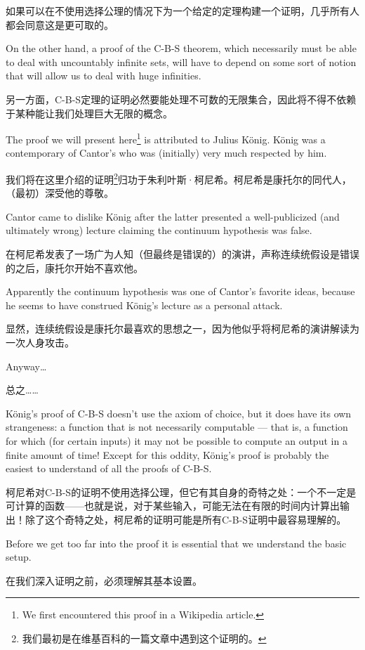 如果可以在不使用选择公理的情况下为一个给定的定理构建一个证明，几乎所有人都会同意这是更可取的。

On the other hand,
a proof of the C-B-S theorem, which necessarily must be able to deal with
uncountably infinite sets, will have to depend on some sort of notion that
will allow us to deal with huge infinities.

另一方面，C-B-S定理的证明必然要能处理不可数的无限集合，因此将不得不依赖于某种能让我们处理巨大无限的概念。

The proof we will present here\footnote{We first encountered this proof
    in a Wikipedia article\cite{wiki-CBS}.} is attributed to Julius K\"{o}nig.
K\"{o}nig was a contemporary of Cantor's who was (initially) very
much respected by him.

我们将在这里介绍的证明\footnote{我们最初是在维基百科的一篇文章\cite{wiki-CBS}中遇到这个证明的。}归功于朱利叶斯·柯尼希。柯尼希是康托尔的同代人，（最初）深受他的尊敬。

Cantor came to dislike K\"{o}nig after the
latter presented a well-publicized (and ultimately wrong) lecture
claiming the continuum hypothesis was false.

在柯尼希发表了一场广为人知（但最终是错误的）的演讲，声称连续统假设是错误的之后，康托尔开始不喜欢他。

Apparently the continuum hypothesis was one of Cantor's favorite ideas,
because he seems to have construed K\"{o}nig's lecture as a personal attack.

显然，连续统假设是康托尔最喜欢的思想之一，因为他似乎将柯尼希的演讲解读为一次人身攻击。

Anyway\ldots

总之……

K\"{o}nig's proof of C-B-S doesn't use the axiom of choice, but it does have
its own strangeness: a function that is not necessarily computable --- that is,
a function for which (for certain inputs) it may not be possible to compute
an output in a finite amount of time!  Except for this oddity,
K\"{o}nig's proof
is probably the easiest to understand of all the proofs of C-B-S.

柯尼希对C-B-S的证明不使用选择公理，但它有其自身的奇特之处：一个不一定是可计算的函数——也就是说，对于某些输入，可能无法在有限的时间内计算出输出！除了这个奇特之处，柯尼希的证明可能是所有C-B-S证明中最容易理解的。

Before we get too far into the proof it is essential that we understand the
basic setup.

在我们深入证明之前，必须理解其基本设置。

